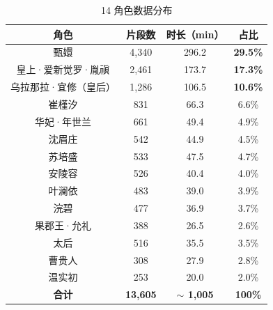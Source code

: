 \documentclass[12pt,a4paper]{article}
\begin{document}
\begin{table}[H]
\centering
\caption{14 角色数据分布}
\label{tab:data-dist}
\begin{tabular}{cccc}
\toprule
\textbf{角色} & \textbf{片段数} & \textbf{时长（min）} & \textbf{占比} \\
\midrule
\rowcolor{Amid!15} 甄嬛                         & 4,340 & 296.2 & \textbf{29.5\%} \\
\rowcolor{Amid!10} 皇上·爱新觉罗·胤禛             & 2,461 & 173.7 & \textbf{17.3\%} \\
\rowcolor{Amid!5}  乌拉那拉·宜修（皇后）           & 1,286 & 106.5 & \textbf{10.6\%} \\
崔槿汐                       & 831   & 66.3  & 6.6\%  \\
华妃·年世兰                   & 661   & 49.4  & 4.9\%  \\
沈眉庄                       & 542   & 44.9  & 4.5\%  \\
苏培盛                       & 533   & 47.5  & 4.7\%  \\
安陵容                       & 526   & 40.4  & 4.0\%  \\
叶澜依                       & 483   & 39.0  & 3.9\%  \\
浣碧                         & 477   & 36.9  & 3.7\%  \\
果郡王·允礼                   & 388   & 26.5  & 2.6\%  \\
太后                         & 516   & 35.5  & 3.5\%  \\
曹贵人                       & 308   & 27.9  & 2.8\%  \\
温实初                       & 253   & 20.0  & 2.0\%  \\
\midrule
\textbf{合计}                 & \textbf{13,605} & \textbf{$\sim$ 1,005} & \textbf{100\%} \\
\bottomrule
\end{tabular}
\end{table}
\end{document}

